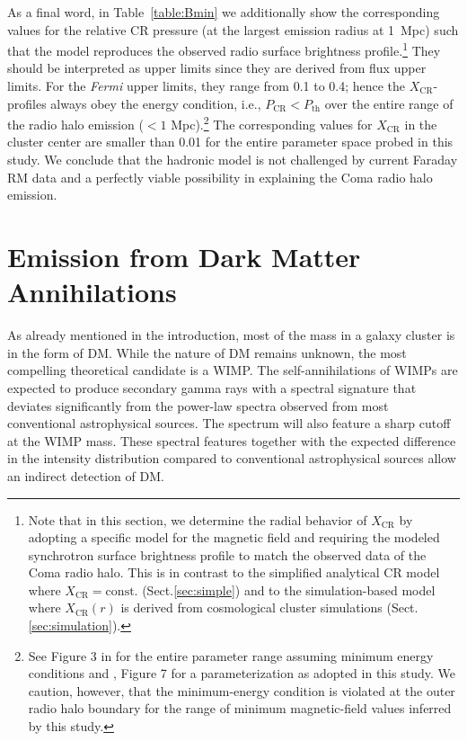 \documentclass[12pt,manuscript]{aastex}
\def\Fermi{{\em Fermi}\xspace}
\newcommand{\rmn}{\mathrm}
\newcommand{\CR}{\mathrm{CR}}
\begin{document}
As a final word, in Table~\ref{table:Bmin} we additionally show the corresponding values for the
relative CR pressure (at the largest emission radius at 1~Mpc) such that the model reproduces the
observed radio surface brightness profile.\footnote{Note that in this section, we determine the
radial behavior of $X_\CR$ by adopting a specific model for the magnetic field and requiring the
modeled synchrotron surface brightness profile to match the observed data of the Coma radio
halo. This is in contrast to the simplified analytical CR model where $X_\CR=\rmn{const.}$
(Sect.\ref{sec:simple}) and to the simulation-based model where $X_\CR(r)$ is derived from
cosmological cluster simulations (Sect.\ref{sec:simulation}).} They should be interpreted as upper
limits since they are derived from flux upper limits. For the \Fermi upper limits, they range
from 0.1 to 0.4; hence the $X_{\CR}$-profiles always obey the energy condition, i.e., $P_{\CR} <
P_{\mathrm{th}}$ over the entire range of the radio halo emission ($< 1$ Mpc).\footnote{See Figure 3
in \citet{article:PfrommerEnsslin:2004a} for the entire parameter range assuming minimum energy
conditions and \citet{article:PfrommerEnsslin:2004b}, Figure 7 for a parameterization as adopted in
this study. We caution, however, that the minimum-energy condition is violated at the outer radio
halo boundary for the range of minimum magnetic-field values inferred by this study.} The
corresponding values for $X_\CR$ in the cluster center are smaller than 0.01 for the entire
parameter space probed in this study. We conclude that the hadronic model is not challenged by
current Faraday RM data and a perfectly viable possibility in explaining the Coma radio halo
emission.

%
%

\section{Emission from Dark Matter Annihilations}
As already mentioned in the introduction, most of the mass in a galaxy cluster is in the form of
DM. While the nature of DM remains unknown, the most compelling theoretical candidate is a
WIMP. The self-annihilations of WIMPs are expected to produce secondary gamma rays with a
spectral signature that deviates significantly from the power-law spectra observed from most
conventional astrophysical sources. The spectrum will also feature a sharp cutoff at the WIMP
mass. These spectral features together with the expected difference in the
intensity distribution compared to conventional astrophysical sources allow an
indirect detection of DM.
\end{document}
